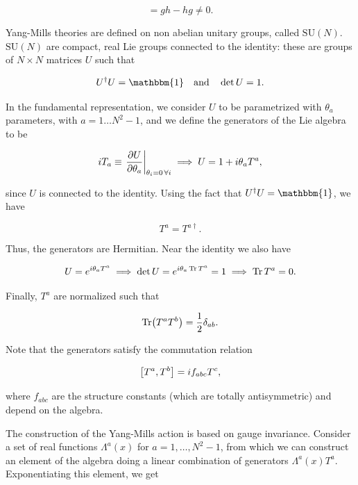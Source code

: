 \documentclass[reqno,12pt]{article}
\numberwithin{equation}{section}
\newcommand{\SU}{\mathrm{SU}}
\newcommand{\id}{\mathbbm{1}}
\begin{document}
\begin{equation}
	[g, h] = gh - hg \ne 0.
\end{equation}

Yang-Mills theories are defined on non abelian unitary groups, called $\SU(N)$. 
$\SU(N)$ are compact, real Lie groups connected to the identity: these are groups of $N \times N$ matrices $U$
such that

\begin{equation}
	U^\dagger U = \id \qq{and} \det U = 1.
\end{equation}

In the fundamental representation, we consider $U$ to be parametrized with $\theta_a$ parameters, 
with $a = 1 \dots N^2 - 1$, and we define the generators of the Lie algebra to be

\begin{equation}
	iT_a \equiv \eval{\pdv{U}{\theta_a}}_{\theta_i = 0\,\forall i} \implies U = 1 + i \theta_aT^a,
\end{equation}

since $U$ is connected to the identity. Using the fact that $U^\dagger U = \id$, we have

\begin{equation}
	T^a = T^{a \dagger}.
\end{equation}

Thus, the generators are Hermitian. Near the identity we also have

\begin{equation}
	U = e^{i\theta_a T^a} \implies \det U = e^{i\theta_a \Tr T^a} = 1 \implies \Tr T^a = 0.
\end{equation}

Finally, $T^a$ are normalized such that

\begin{equation}
	\Tr(T^a T^b) = \frac{1}{2}\delta_{ab}.
\end{equation}

Note that the generators satisfy the commutation relation

\begin{equation}
	\qty[T^a, T^b] = if_{abc} T^c,	
\end{equation}

where $f_{abc}$ are the structure constants (which are totally antisymmetric) and depend on the algebra. 

The construction of the Yang-Mills action is based on gauge invariance. Consider a set of real functions $\Lambda^a(x)$ 
for $a = 1, \dots, N^2 - 1$, from which we can construct an element of the algebra doing a linear combination of generators
$\Lambda^a(x)T^a$. Exponentiating this element, we get 
\end{document}

